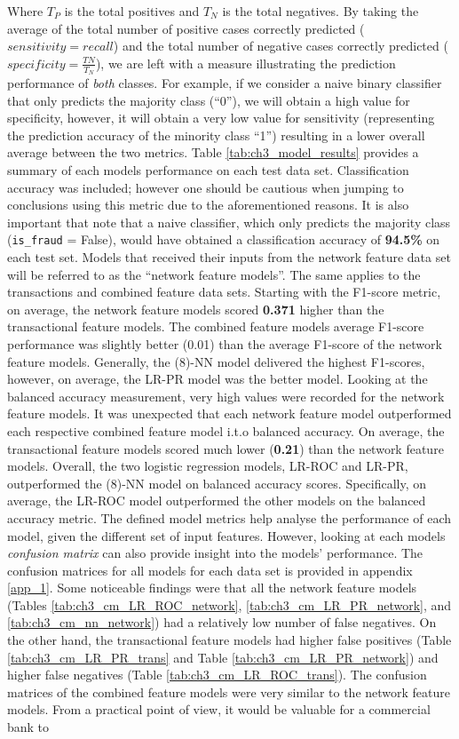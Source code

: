 Where $T_{P}$ is the total positives and $T_{N}$ is the total negatives. By taking the average of the total number of positive cases correctly predicted ($sensitivity = recall$) and the total number of negative cases correctly predicted ($specificity = \frac{TN}{T_{N}}$), we are left with a measure illustrating the prediction performance of \textit{both} classes. For example, if we consider a naive binary classifier that only predicts the majority class (``0''), we will obtain a high value for specificity, however, it will obtain a very low value for sensitivity (representing the prediction accuracy of the minority class ``1'') resulting in a lower overall average between the two metrics. 
Table \ref{tab:ch3_model_results} provides a summary of each models performance on each test data set. Classification accuracy was included; however one should be cautious when jumping to conclusions using this metric due to the aforementioned reasons. It is also important that note that a naive classifier, which only predicts the majority class (\texttt{is\_fraud} = False), would have obtained a classification accuracy of \textbf{94.5\%} on each test set. Models that received their inputs from the network feature data set will be referred to as the ``network feature models''. The same applies to the transactions and combined feature data sets. Starting with the F1-score metric, on average, the network feature models scored \textbf{0.371} higher than the transactional feature models. The combined feature models average F1-score performance was slightly better (0.01) than the average F1-score of the network feature models. Generally, the (8)-NN model delivered the highest F1-scores, however, on average, the LR-PR model was the better model. Looking at the balanced accuracy measurement, very high values were recorded for the network feature models. It was unexpected that each network feature model outperformed each respective combined feature model i.t.o balanced accuracy. On average, the transactional feature models scored much lower (\textbf{0.21}) than the network feature models. Overall, the two logistic regression models, LR-ROC and LR-PR, outperformed the (8)-NN model on balanced accuracy scores. Specifically, on average, the LR-ROC model outperformed the other models on the balanced accuracy metric. The defined model metrics help analyse the performance of each model, given the different set of input features. However, looking at each models \textit{confusion matrix} can also provide insight into the models' performance. The confusion matrices for all models for each data set is provided in appendix \ref{app_1}. Some noticeable findings were that all the network feature models (Tables \ref{tab:ch3_cm_LR_ROC_network}, \ref{tab:ch3_cm_LR_PR_network}, and \ref{tab:ch3_cm_nn_network}) had a relatively low number of false negatives. On the other hand, the transactional feature models had higher false positives (Table \ref{tab:ch3_cm_LR_PR_trans} and Table \ref{tab:ch3_cm_LR_PR_network}) and higher false negatives (Table \ref{tab:ch3_cm_LR_ROC_trans}). The confusion matrices of the combined feature models were very similar to the network feature models. From a practical point of view, it would be valuable for a commercial bank to 